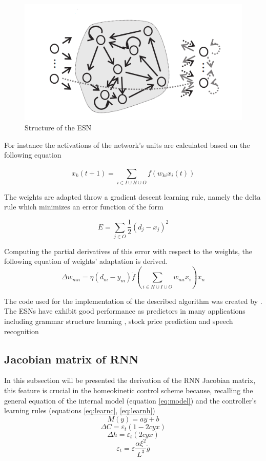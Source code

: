 \documentclass[msc,ai,logo]{infthesis}
\begin{document}
 
 \begin{figure}[H]
\includegraphics[scale=0.6]{ESN.png}
\centering
\caption{Structure of the ESN \citep{jaeger2}}
\label{fig:ESN}
\end{figure}    
 
For instance the activations of the network's units are  calculated based on the following equation     
  
\begin{equation}
\label{eq:ESNac}
{x_k}(t + 1) = \sum\limits_{i \in I \cup H \cup O}^{} {f({w_{ki}}{x_i(t)})} 
\end{equation}   
  
The weights are adapted throw a gradient descent learning rule, namely the delta rule which minimizes an error function of the form

 \[E = \sum\limits_{j \in O}^{} {\frac{1}{2}{{({d_j} - {x_j})}^2}} \]
 
 Computing the partial derivatives of this error with respect to the weights, the following equation of weights' adaptation is derived.
 \begin{equation}
\Delta {w_{mn}} = \eta ({d_m} - {y_m})\dot f(\sum\limits_{i \in H \cup I \cup O}^{} {{w_{mi}}{x_i}} ){x_n} 
 \end{equation}
 
 The code used for the implementation of the described algorithm was created by \cite{lpzrobots}. The ESNs have exhibit good performance as  predictors in many applications including grammar structure learning \citep{Tong}, stock price prediction \citep{Lin} and speech recognition \citep{Skowronski}  
 
\subsection{Jacobian matrix of RNN} 
In this subsection will be presented the derivation of the RNN Jacobian matrix, this feature is crucial in the homeokinetic control scheme because, recalling the general equation of the internal model (equation \ref{eq:model}) and the controller's learning rules (equations \ref{eq:learnc}, \ref{eq:learnh}) 
\[M(y)=ay+b\]
\[\Delta C = \varepsilon _t(1 - 2cyx)\]
\[\Delta h = \varepsilon _t(2cyx)\]
\[{\varepsilon _t} = \varepsilon \frac{{\alpha {\xi ^2}}}{{{L^3}}} \dot{g}\]
\end{document}
